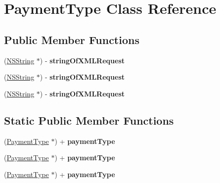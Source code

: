 \hypertarget{interface_payment_type}{
\section{PaymentType Class Reference}
\label{interface_payment_type}
}
\subsection*{Public Member Functions}
\begin{DoxyCompactItemize}
\item 
\hypertarget{interface_payment_type_ad62244c323f5a04d73472da0945b0086}{
(\hyperlink{class_n_s_string}{NSString} $\ast$) -\/ {\bfseries stringOfXMLRequest}}
\label{interface_payment_type_ad62244c323f5a04d73472da0945b0086}

\item 
\hypertarget{interface_payment_type_ad62244c323f5a04d73472da0945b0086}{
(\hyperlink{class_n_s_string}{NSString} $\ast$) -\/ {\bfseries stringOfXMLRequest}}
\label{interface_payment_type_ad62244c323f5a04d73472da0945b0086}

\item 
\hypertarget{interface_payment_type_ad62244c323f5a04d73472da0945b0086}{
(\hyperlink{class_n_s_string}{NSString} $\ast$) -\/ {\bfseries stringOfXMLRequest}}
\label{interface_payment_type_ad62244c323f5a04d73472da0945b0086}

\end{DoxyCompactItemize}
\subsection*{Static Public Member Functions}
\begin{DoxyCompactItemize}
\item 
\hypertarget{interface_payment_type_a740f9c26965773669574e926416387fa}{
(\hyperlink{interface_payment_type}{PaymentType} $\ast$) + {\bfseries paymentType}}
\label{interface_payment_type_a740f9c26965773669574e926416387fa}

\item 
\hypertarget{interface_payment_type_a740f9c26965773669574e926416387fa}{
(\hyperlink{interface_payment_type}{PaymentType} $\ast$) + {\bfseries paymentType}}
\label{interface_payment_type_a740f9c26965773669574e926416387fa}

\item 
\hypertarget{interface_payment_type_a740f9c26965773669574e926416387fa}{
(\hyperlink{interface_payment_type}{PaymentType} $\ast$) + {\bfseries paymentType}}
\label{interface_payment_type_a740f9c26965773669574e926416387fa}

\end{DoxyCompactItemize}
